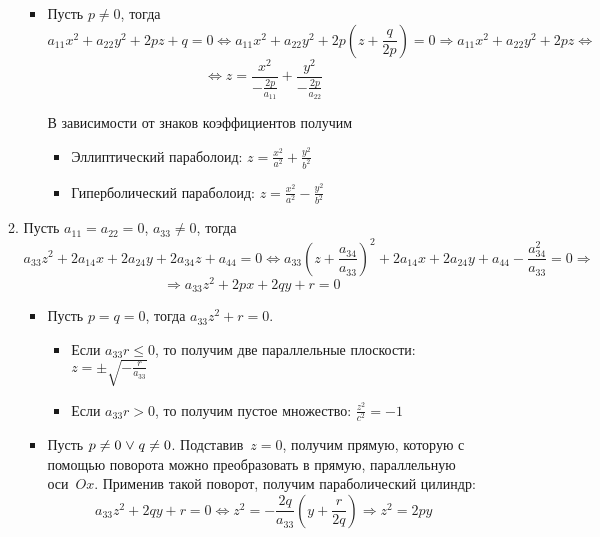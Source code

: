\begin{enumerate}
\begin{enumerate}
\begin{itemize}
			\item Пусть $p \neq 0$, тогда
			\begin{equation*}
			a_{11} x^2 + a_{22} y^2 + 2 pz + q = 0 \Leftrightarrow
			a_{11} x^2 + a_{22} y^2 + 2 p \left(z + \frac{q}{2p}\right) = 0 \Rightarrow
			a_{11} x^2 + a_{22} y^2 + 2 pz \Leftrightarrow
			\end{equation*}
			\begin{equation*}
			\Leftrightarrow z = \frac{x^2}{-\frac{2p}{a_{11}}} + \frac{y^2}{-\frac{2p}{a_{22}}}
			\end{equation*}
			
			В зависимости от знаков коэффициентов получим
			\begin{itemize}
				\item Эллиптический параболоид:
				$\displaystyle z = \frac{x^2}{a^2} + \frac{y^2}{b^2}$
				\item Гиперболический параболоид:
				$\displaystyle z = \frac{x^2}{a^2} - \frac{y^2}{b^2}$
			\end{itemize}
		\end{itemize}
		
		\item Пусть $a_{11} = a_{22} = 0$, $a_{33} \neq 0$, тогда
		\begin{equation*}
		a_{33} z^2 + 2 a_{14} x + 2 a_{24} y + 2 a_{34} z + a_{44} = 0 \Leftrightarrow
		a_{33} \left(z + \frac{a_{34}}{a_{33}}\right)^2 + 2 a_{14} x + 2 a_{24} y + a_{44} - \frac{a_{34}^2}{a_{33}} = 0 \Rightarrow
		\end{equation*}
		\begin{equation*}
		\Rightarrow a_{33} z^2 + 2 p x + 2 q y + r = 0
		\end{equation*}
		\begin{itemize}
			\item Пусть $p = q = 0$, тогда $a_{33} z^2 + r = 0$.
			\begin{itemize}
				\item Если $a_{33} r \leqslant 0$, то получим две параллельные плоскости:
				$\displaystyle z = \pm\sqrt{-\frac{r}{a_{33}}}$
				\item Если $a_{33} r > 0$, то получим пустое множество:
				$\displaystyle \frac{z^2}{c^2} = -1$
			\end{itemize}
			
			\item Пусть $p \neq 0 \mathrel{\lor} q \neq 0$.
			Подставив~$z = 0$, получим прямую, которую с помощью поворота можно преобразовать в прямую, параллельную оси~$Ox$.
			Применив такой поворот, получим параболический цилиндр:
			\begin{equation*}
			a_{33} z^2 + 2 q y + r = 0 \Leftrightarrow
			z^2 = -\frac{2q}{a_{33}} \left(y + \frac{r}{2q} \right) \Rightarrow
			z^2 = 2py
			\end{equation*}
		\end{itemize}
	\end{enumerate}
\end{enumerate}

